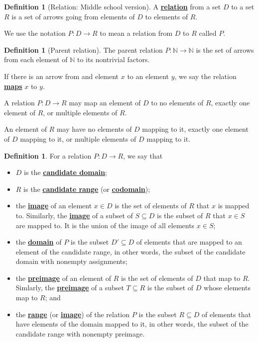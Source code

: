 \documentclass[11pt]{article}
\newcommand{\N}{\mathbb{N}}
\renewcommand\subset\subseteq
\renewcommand\emph[1]{\underline{\bf{#1}}} %
\theoremstyle{definition}
\newtheorem{definition}[theorem]{Definition}
\begin{document}
\begin{definition}[Relation: Middle school version]\label{d: relation middle school}
A \emph{relation} from a set $D$ to a set $R$ is a set of arrows going from elements of $D$ to elements of $R$.  
\end{definition}

We use the notation $P:D\to R$ to mean a relation from $D$ to $R$ called $P$.

\begin{definition}[Parent relation]\label{d: parent relation}
The parent relation $P:\N\to\N$ is the set of arrows from each element of $\N$ to its nontrivial factors.

If there is an arrow from and element $x$ to an element $y$, we say the relation \emph{maps} $x$ to $y$.
\end{definition}

\begin{note}
A relation $P:D\to R$ may map an element of $D$ to no elements of $R$, exactly one element of $R$, or multiple elements of $R$. 

An element of $R$ may have no elements of $D$ mapping to it, exactly one element of $D$ mapping to it, or multiple elements of $D$ mapping to it.
\end{note}

\begin{definition}\label{d: candidate domain etc}
For a relation $P:D \to R$, we say that 
	\begin{itemize}
	\item $D$ is the \emph{candidate domain};
	\item $R$ is the \emph{candidate range} (or \emph{codomain});
	\item the \emph{image} of an element $x\in  D$ is the set of elements of $R$ that $x$ is mapped to. Similarly, the \emph{image} of a subset of $S\subset D$ is the subset of $R$ that $x\in S$ are mapped to. It is the union of the image of all elements $x\in S$;
	\item the \emph{domain} of $P$ is the subset $D'\subset D$ of elements that are mapped to an element of the candidate range, in other words, the subset of the candidate domain with nonempty assignments; 
	\item the \emph{preimage} of an element of $R$ is the set of elements of $D$ that map to $R$. Simlarly, the \emph{preimage} of a subset $T\subset R$ is the subset of $D$ whose elements map to $R$; and
	\item the \emph{range} (or \emph{image}) of the relation $P$ is the subset $R\subset D$ of elements that have elements of the domain mapped to it, in other words, the subset of the candidate range with nonempty preimage.
	\end{itemize}
\end{definition}
\end{document}
